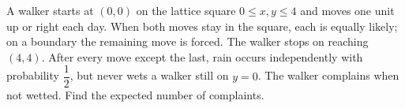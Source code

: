 A walker starts at $(0,0)$ on the lattice square $0\le x,y\le4$ and moves one unit up or right each day. When both moves stay in the square, each is equally likely; on a boundary the remaining move is forced. The walker stops on reaching $(4,4)$. After every move except the last, rain occurs independently with probability $\dfrac{1}{2}$, but never wets a walker still on $y=0$. The walker complains when not wetted. Find the expected number of complaints.
